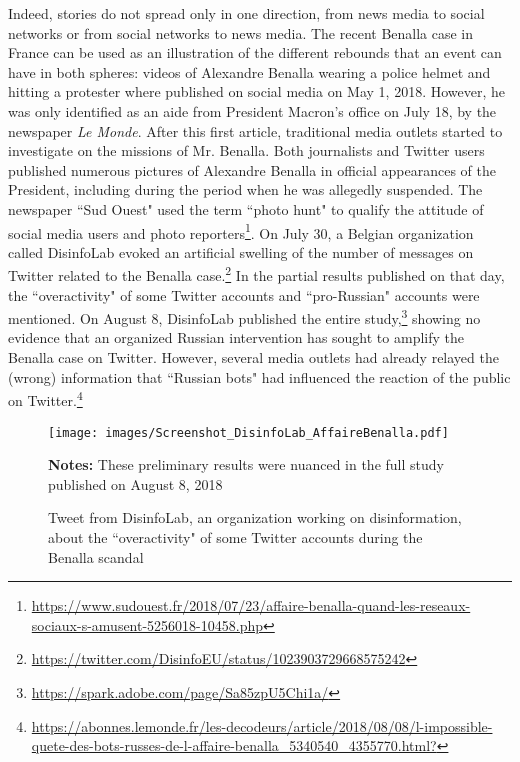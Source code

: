 Indeed, stories do not spread only in one direction, from news media to social networks or from social networks to news media. The recent Benalla case in France can be used as an illustration of the different rebounds that an event can have in both spheres: videos of Alexandre Benalla wearing a police helmet and hitting a protester where published on social media on May 1, 2018. However, he was only identified as an aide from President Macron's office on July 18, by the newspaper \textit{Le Monde}. After this first article, traditional media outlets started to investigate on the missions of Mr. Benalla. Both journalists and Twitter users published numerous pictures of Alexandre Benalla in official appearances of the President, including during the period when he was allegedly suspended. The newspaper ``Sud Ouest" used the term ``photo hunt" to qualify the attitude of social media users and photo reporters\footnote{\url{https://www.sudouest.fr/2018/07/23/affaire-benalla-quand-les-reseaux-sociaux-s-amusent-5256018-10458.php}}. On July 30, a Belgian organization called DisinfoLab evoked an artificial swelling of the number of messages on Twitter related to the Benalla case.\footnote{\url{https://twitter.com/DisinfoEU/status/1023903729668575242}} In the partial results published on that day, the ``overactivity" of some Twitter accounts and ``pro-Russian" accounts were mentioned. On August 8, DisinfoLab published the entire study,\footnote{\url{https://spark.adobe.com/page/Sa85zpU5Chi1a/}} showing no evidence that an organized Russian intervention has sought to amplify the Benalla case on Twitter. However, several media outlets had already relayed the (wrong) information that ``Russian bots"  had influenced the reaction of the public on Twitter.\footnote{\url{https://abonnes.lemonde.fr/les-decodeurs/article/2018/08/08/l-impossible-quete-des-bots-russes-de-l-affaire-benalla_5340540_4355770.html?}}
\newline

\begin{figure}
\begin{center}
\texttt{[image: images/Screenshot\_DisinfoLab\_AffaireBenalla.pdf]}
\end{center}
{\scriptsize \textbf{Notes:} These preliminary results were nuanced in the full study published on August 8, 2018}
\caption{Tweet from DisinfoLab, an organization working on disinformation, about the ``overactivity" of some Twitter accounts during the Benalla scandal}
\label{Figure:DisinfoLab}
\end{figure}

